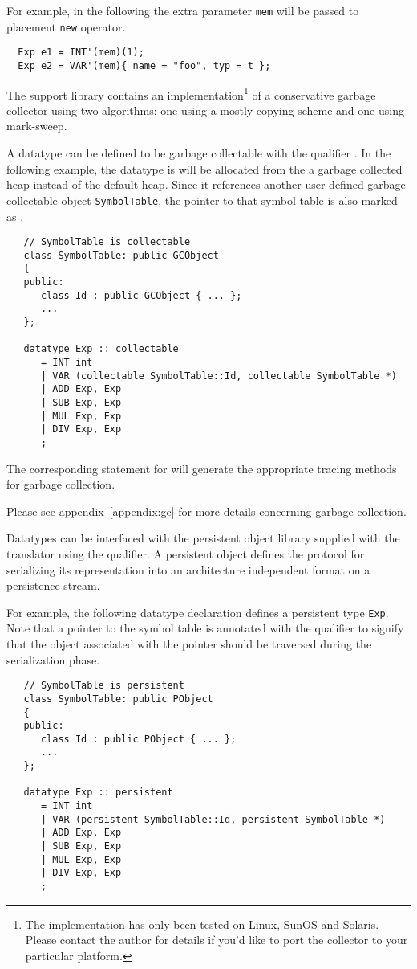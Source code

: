 For example, in the following the extra parameter \verb|mem| will
be passed to placement \verb|new| operator.
\begin{verbatim}
  Exp e1 = INT'(mem)(1);
  Exp e2 = VAR'(mem){ name = "foo", typ = t };
\end{verbatim}


  The support library contains an implementation\footnote{The implementation
has only been tested on Linux, SunOS and Solaris.  Please contact the
author for details
if you'd like to port the collector to your particular platform.} of a 
conservative garbage collector using two algorithms: one using
a mostly copying scheme\cite{Mostly-copying,Gen-mostly-copying} 
and one using mark-sweep.

  A datatype can be defined to be garbage collectable with the
qualifier .  In the following example, the datatype
 is will be allocated from the a garbage collected heap instead
of the default heap.  Since it references another 
user defined garbage collectable object
\verb|SymbolTable|, the pointer to that symbol table is also marked
as .
\begin{verbatim}
   // SymbolTable is collectable
   class SymbolTable: public GCObject
   {
   public:
      class Id : public GCObject { ... };
      ...
   };

   datatype Exp :: collectable
      = INT int
      | VAR (collectable SymbolTable::Id, collectable SymbolTable *)
      | ADD Exp, Exp
      | SUB Exp, Exp
      | MUL Exp, Exp
      | DIV Exp, Exp
      ;
\end{verbatim}

The corresponding  statement for 
will generate the appropriate tracing methods for garbage collection.

Please see appendix~\ref{appendix:gc} for more details concerning
garbage collection.


  Datatypes can be interfaced with the persistent object library
supplied with the translator using the  qualifier.
A persistent object defines the protocol for serializing its representation
into an architecture independent format on a persistence stream.  

For example, the following datatype declaration defines a persistent 
type \verb|Exp|.  Note that a pointer to the symbol table
is annotated with the  qualifier to signify that the object
associated with the pointer should be traversed during the serialization
phase. 
\begin{verbatim}
   // SymbolTable is persistent
   class SymbolTable: public PObject
   {
   public:
      class Id : public PObject { ... };
      ...
   };

   datatype Exp :: persistent
      = INT int
      | VAR (persistent SymbolTable::Id, persistent SymbolTable *)
      | ADD Exp, Exp
      | SUB Exp, Exp
      | MUL Exp, Exp
      | DIV Exp, Exp
      ;
\end{verbatim}

